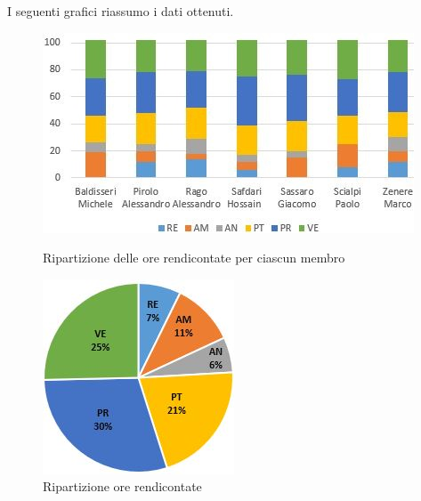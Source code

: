 I seguenti grafici riassumo i dati ottenuti.

\begin{figure}[!htb]
   \begin{minipage}{0.6\textwidth}
     \centering
     \includegraphics{Images/PO-OreRendicontate}
     \caption{Ripartizione delle ore rendicontate per ciascun membro}
   \end{minipage}\hspace{0.1\textwidth}
   \begin{minipage}{0.3\textwidth}
     \centering
     \includegraphics[width=.9\textwidth]{Images/PE-OreRendicontate}
     \captionsetup{width=.9\textwidth}
     \caption{Ripartizione ore rendicontate}
   \end{minipage}
\end{figure}

